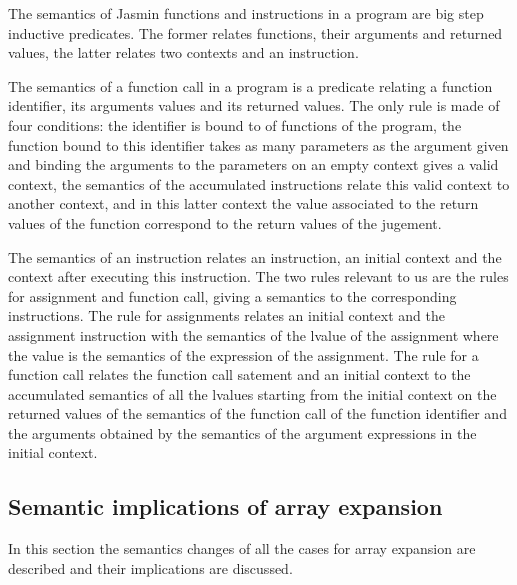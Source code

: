 \documentclass{article}
\begin{document}
The semantics of Jasmin functions and instructions in a program are big step
inductive predicates. The former relates functions, their arguments and returned
values, the latter relates two contexts and an instruction.

The semantics of a function call in a program is a predicate relating a function
identifier, its arguments values and its returned values. The only rule is made
of four conditions: the identifier is bound to of functions of the program, the
function bound to this identifier takes as many parameters as the argument given
and binding the arguments to the parameters on an empty context gives a valid
context, the semantics of the accumulated instructions relate this valid context
to another context, and in this latter context the value associated to the
return values of the function correspond to the return values of the jugement.

\smallskip

The semantics of an instruction relates an instruction, an initial context and the
context after executing this instruction. The two rules relevant to us are the
rules for assignment and function call, giving a semantics to the corresponding
instructions. The rule for assignments relates an initial context and the assignment
instruction with the semantics of the lvalue of the assignment where the
value is the semantics of the expression of the assignment. The rule for a
function call relates the function call satement and an initial context to the
accumulated semantics of all the lvalues starting from the initial context
on the returned values of the semantics of the function call of the function
identifier and the arguments obtained by the semantics of the argument
expressions in the initial context.


\subsection{Semantic implications of array expansion}

In this section the semantics changes of all the cases for array expansion are
described and their implications are discussed.
\end{document}
